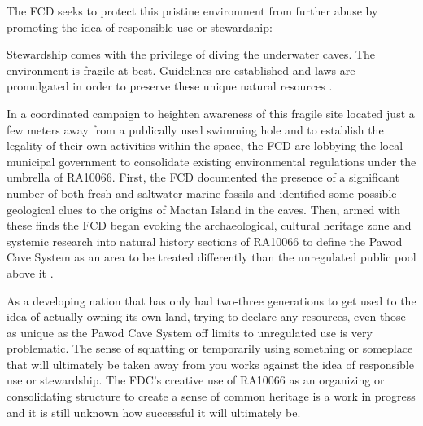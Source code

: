 The FCD seeks to protect this pristine environment from further abuse by promoting the idea of responsible use or stewardship:

\begin{displayquote}
	Stewardship comes with the privilege of diving the underwater caves. The environment is fragile at best. Guidelines are established and laws are promulgated in order to preserve these unique natural resources \parencite{Divers_2014b}.
\end{displayquote}

In a coordinated campaign to heighten awareness of this fragile site located just a few meters away from a publically used swimming hole and to establish the legality of their own activities within the space, the FCD are lobbying the local municipal government to consolidate existing environmental regulations under the umbrella of RA10066. First, the FCD documented the presence of a significant number of both fresh and saltwater marine fossils and identified some possible geological clues to the origins of Mactan Island in the caves. Then,  armed with these finds the FCD began evoking the archaeological, cultural heritage zone and systemic research into natural history sections of RA10066 to define the Pawod Cave System as an area to be treated differently than the unregulated public pool above it \parencite{Divers_2014b}.

As a developing nation that has only had two-three generations to get used to the idea of actually owning its own land, trying to declare any resources, even those as unique as the Pawod Cave System off limits to unregulated use is very problematic. The sense of squatting or temporarily using something or someplace that will ultimately be taken away from you works against the idea of responsible use or stewardship. The FDC’s creative use of RA10066 as an organizing or consolidating structure to create a sense of common heritage is a work in progress and it is still unknown how successful it will ultimately be.


